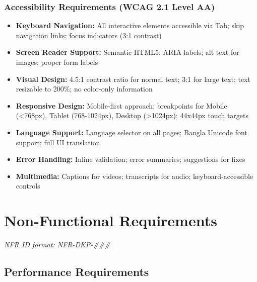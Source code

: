 \documentclass[12pt,a4paper]{report}
\begin{document}
\subsection{Accessibility Requirements (WCAG 2.1 Level AA)}

\begin{itemize}
    \item \textbf{Keyboard Navigation:} All interactive elements accessible via Tab; skip navigation links; focus indicators (3:1 contrast)
    \item \textbf{Screen Reader Support:} Semantic HTML5; ARIA labels; alt text for images; proper form labels
    \item \textbf{Visual Design:} 4.5:1 contrast ratio for normal text; 3:1 for large text; text resizable to 200\%; no color-only information
    \item \textbf{Responsive Design:} Mobile-first approach; breakpoints for Mobile (<768px), Tablet (768-1024px), Desktop (>1024px); 44x44px touch targets
    \item \textbf{Language Support:} Language selector on all pages; Bangla Unicode font support; full UI translation
    \item \textbf{Error Handling:} Inline validation; error summaries; suggestions for fixes
    \item \textbf{Multimedia:} Captions for videos; transcripts for audio; keyboard-accessible controls
\end{itemize}

\chapter{Non-Functional Requirements}

\textit{NFR ID format: NFR-DKP-\#\#\#}

\section{Performance Requirements}
\end{document}
